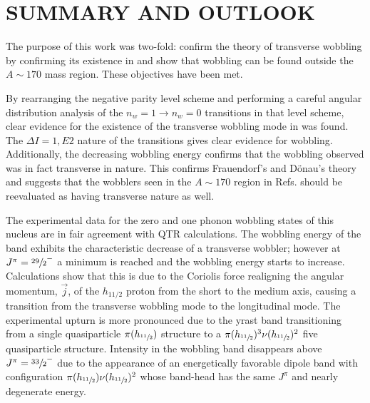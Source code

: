 %
%

\chapter{SUMMARY AND OUTLOOK}
\label{chp:wob-disc}

The purpose of this work was two-fold: confirm the theory of transverse wobbling by confirming its existence in \pr{} and show that wobbling can be found outside the $A\sim{}170$ mass region. These objectives have been met.

By rearranging the negative parity level scheme and performing a careful angular distribution analysis of the $n_w=1\rightarrow{}n_w=0$ transitions in that level scheme, clear evidence for the existence of the transverse wobbling mode in \pr{} was found. The $\Delta{}I=1, E2$ nature of the transitions gives clear evidence for wobbling. Additionally, the decreasing wobbling energy confirms that the wobbling observed was in fact transverse in nature. This confirms Frauendorf's and D\"onau's theory and suggests that the wobblers seen in the $A\sim{}170$ region in Refs. \cite{wobblingIn163Lu,wobblingIn163LuTwoPhonon,wobblingIn165Lu,wobblingIn167Lu,wobblingIn161Lu,wobblingIn167Ta} should be reevaluated as having transverse nature as well.

The experimental data for the zero and one phonon wobbling states of this nucleus are in fair agreement with QTR calculations. The wobbling energy of the band exhibits the characteristic decrease of a transverse wobbler; however at $J^{\pi}=\sfrac{29}{2}^-$ a minimum is reached and the wobbling energy starts to increase. Calculations show that this is due to the Coriolis force realigning the angular momentum, $\vec{j}$, of the $h_{11/2}$ proton from the short to the medium axis, causing a transition from the transverse wobbling mode to the longitudinal mode. The experimental upturn is more pronounced due to the yrast band transitioning from a single quasiparticle $\pi{}(h_{\sfrac{11}{2}})$ structure to a $\pi{}(h_{\sfrac{11}{2}})^3\nu{}(h_{\sfrac{11}{2}})^2$ five quasiparticle structure. Intensity in the wobbling band disappears above $J^{\pi}=\sfrac{33}{2}^-$ due to the appearance of an energetically favorable dipole band with configuration $\pi{}(h_{\sfrac{11}{2}})\nu{}(h_{\sfrac{11}{2}})^2$ whose band-head has the same $J^{\pi}$ and nearly degenerate energy.

